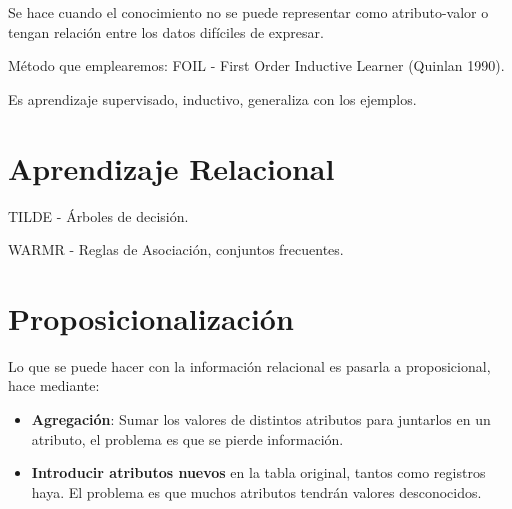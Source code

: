 \documentclass[12pt, twoside, openright]{report} %
\begin{document}
Se hace cuando el conocimiento no se puede representar como atributo-valor o tengan relación entre los datos difíciles de expresar.

Método que emplearemos: FOIL - First Order Inductive Learner (Quinlan 1990).

Es aprendizaje supervisado, inductivo, generaliza con los ejemplos.

\section{Aprendizaje Relacional}
TILDE - Árboles de decisión.

WARMR - Reglas de Asociación, conjuntos frecuentes.

\section{Proposicionalización}
Lo que se puede hacer con la información relacional es pasarla a proposicional, hace mediante:
\begin{itemize}
	\item \textbf{Agregación}: Sumar los valores de distintos atributos para juntarlos en un atributo, el problema es que se pierde información.
	\item \textbf{Introducir atributos nuevos} en la tabla original, tantos como registros haya. El problema es que muchos atributos tendrán valores desconocidos.
\end{itemize}
\end{document}
